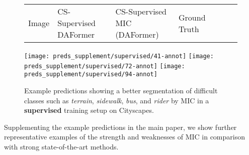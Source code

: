 \documentclass[10pt,twocolumn,letterpaper]{article}
\begin{document}
\begin{figure*}
\centering
{\footnotesize
\begin{tabularx}{\linewidth}{*{7}{Y}}
Image & 
CS-Supervised DAFormer~\cite{hoyer2021daformer} & 
CS-Supervised MIC (DAFormer) & Ground Truth \\
\end{tabularx}
} %
\texttt{[image: preds\_supplement/supervised/41-annot]}
\texttt{[image: preds\_supplement/supervised/72-annot]}
\texttt{[image: preds\_supplement/supervised/94-annot]}
\scriptsize \setlength{} \vspace{-0.15cm}
\caption{Example predictions showing a better segmentation of difficult classes such as \emph{terrain}, \emph{sidewalk}, \emph{bus}, and \emph{rider} by MIC in a \textbf{supervised} training setup on Cityscapes.}
\label{fig:predictions_supervised}
\end{figure*} 
Supplementing the example predictions in the main paper, we show further representative examples of the strength and weaknesses of MIC in comparison with strong state-of-the-art methods.
\end{document}
